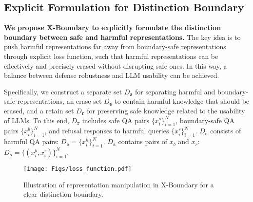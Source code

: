 \subsection{Explicit Formulation for Distinction Boundary}
\label{sec:loss}
\textbf{We propose X-Boundary to explicitly formulate the distinction boundary between safe and harmful representations.}
%
The key idea is to push harmful representations far away from boundary-safe representations through explicit loss function, such that harmful representations can be effectively and precisely erased without disrupting safe ones.
%
In this way, a balance between defense robustness and LLM usability can be achieved.

Specifically, we construct a separate set $D_\texttt{s}$ for separating harmful and boundary-safe representations, an erase set $D_\texttt{e}$ to contain harmful knowledge that should be erased, and a retain set $D_\texttt{r}$ for preserving safe knowledge related to the usability of LLMs. 
%
To this end, $D_\texttt{r}$ includes safe QA pairs $\{x_i^s\}_{i=1}^N$, boundary-safe QA pairs $\{x_i^b\}_{i=1}^N$, and refusal responses to harmful queries $\{x_i^r\}_{i=1}^N$.
%
$D_\texttt{e}$ consists of harmful QA pairs: $D_\texttt{e} = \{x_i^h\}_{i=1}^N$.
%
$D_\texttt{s}$ contains pairs of $x_b$ and $x_r$: $D_\texttt{s} = \{\left(x_i^b, x_i^r\right)\}_{i=1}^N$.
\begin{figure}[t]
\begin{center}
\centerline{\texttt{[image: Figs/loss\_function.pdf]}}
\caption{Illustration of representation manipulation in X-Boundary for a clear distinction boundary.}
\label{fig:loss_function}
\end{center}
\vskip -0.3in
\end{figure}

